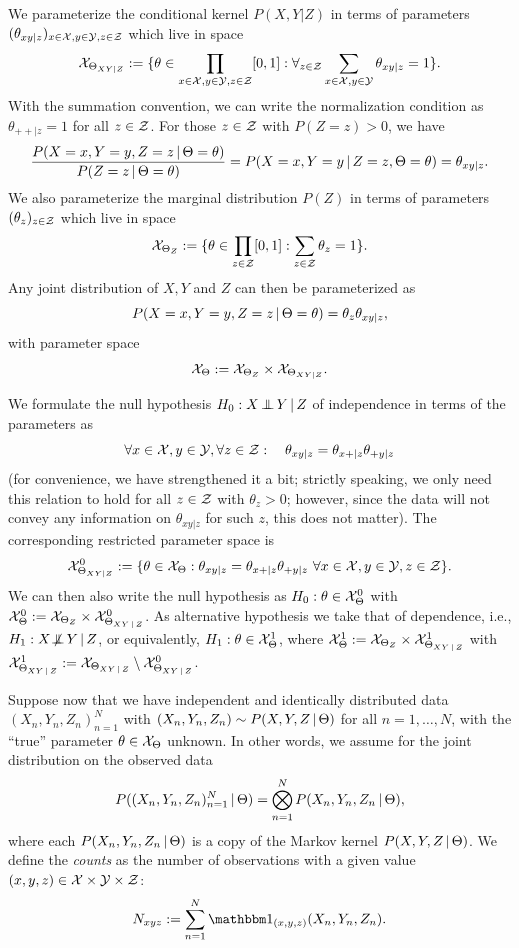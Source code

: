 We parameterize the conditional kernel $P(X,Y | Z)$ in terms of parameters
$(\theta_{xy|z})_{x\in\mathcal{X},y\in\mathcal{Y},z\in\mathcal{Z}}$ which live in space
$$\CX_{\Theta_{XY|Z}} := %
\{ \theta \in \prod_{x\in\C{X},y\in\C{Y},z\in\C{Z}} [0,1] : \forall_{z\in\C{Z}} \sum_{x\in\C{X},y\in\C{Y}} \theta_{xy|z} = 1\}.$$
With the summation convention, we can write the normalization condition as $\theta_{++|z} = 1$ for all $z \in \mathcal{Z}$.
For those $z\in\mathcal{Z}$ with $P(Z = z) > 0$, we have 
$$\frac{P(X = x, Y = y, Z = z \operatorname*{|} \Theta = \theta)}{P(Z=z \operatorname*{|} \Theta=\theta)} = P(X = x, Y = y \operatorname*{|} Z=z, \Theta=\theta) = \theta_{xy|z}.$$
We also parameterize the marginal distribution $P(Z)$ in terms of parameters
$(\theta_z)_{z\in\mathcal{Z}}$ which live in space
$$\mathcal{X}_{\Theta_Z} := \{ \theta \in \prod_{z\in\mathcal{Z}} [0,1] : \sum_{z\in\mathcal{Z}} \theta_z = 1\}.$$
Any joint distribution of $X,Y$ and $Z$ can then be parameterized as
$$P(X=x,Y=y,Z=z \operatorname*{|} \Theta=\theta) = \theta_z \theta_{xy|z},$$
with parameter space
$$\mathcal{X}_\Theta := \mathcal{X}_{\Theta_Z}\times \mathcal{X}_{\Theta_{XY|Z}}.$$

We formulate the null hypothesis $H_0 : X \operatorname*{\perp\mkern-11mu\perp} Y \operatorname*{|} Z$ of independence in terms of the parameters as
$$\forall x \in \mathcal{X}, y \in \mathcal{Y}, \forall z \in \mathcal{Z}: \quad \theta_{xy|z} = \theta_{x+|z} \theta_{+ y|z}$$
(for convenience, we have strengthened it a bit; strictly speaking, we only need this relation to hold
for all $z \in \mathcal{Z}$ with $\theta_z > 0$; however, since the data will not convey any information on $\theta_{xy|z}$ for such $z$, this does not matter).
The corresponding restricted parameter space is
$$\mathcal{X}_{\Theta_{XY|Z}}^0 := \{\theta \in \mathcal{X}_\Theta : \theta_{xy|z} = \theta_{x+|z} \theta_{+ y|z}\ \forall x \in \mathcal{X}, y \in \mathcal{Y}, z \in \mathcal{Z}\}.$$
We can then also write the null hypothesis as $H_0 : \theta \in \mathcal{X}_\Theta^0$ with
$\mathcal{X}_\Theta^0 := \mathcal{X}_{\Theta_Z} \times \mathcal{X}_{\Theta_{XY\operatorname*{|} Z}}^0$.
As alternative hypothesis we take that of dependence, i.e., $H_1 : X \operatorname*{\not\mkern-2mu\perp\mkern-11mu\perp} Y \operatorname*{|} Z$, or equivalently,
$H_1 : \theta \in \mathcal{X}_\Theta^1$, where
$\mathcal{X}_\Theta^1 := \mathcal{X}_{\Theta_Z} \times \mathcal{X}_{\Theta_{XY\operatorname*{|} Z}}^1$ 
with $\mathcal{X}_{\Theta_{XY\operatorname*{|} Z}}^1 := \mathcal{X}_{\Theta_{XY\operatorname*{|} Z}} \setminus \mathcal{X}_{\Theta_{XY\operatorname*{|} Z}}^0$.

Suppose now that we have independent and identically distributed data $(X_n,Y_n,Z_n)_{n=1}^N$ with
$(X_n,Y_n,Z_n) \sim P(X,Y,Z \operatorname*{|} \Theta)$ for all $n=1,\dots,N$, with the ``true'' parameter $\theta \in \mathcal{X}_\Theta$ unknown.
In other words, we assume for the joint distribution on the observed data
$$P((X_n,Y_n,Z_n)_{n=1}^N \operatorname*{|} \Theta) = \bigotimes_{n=1}^N P(X_n,Y_n,Z_n \operatorname*{|} \Theta),$$
where each $P(X_n,Y_n,Z_n \operatorname*{|} \Theta)$ is a copy of the Markov kernel $P(X,Y,Z \operatorname*{|} \Theta)$.
We define the \emph{counts} as the number of observations with a given value $(x,y,z)\in\mathcal{X}\times\mathcal{Y}\times\mathcal{Z}$:
$$N_{xyz} := \sum_{n=1}^N \ind_{(x,y,z)}(X_n,Y_n,Z_n).$$

